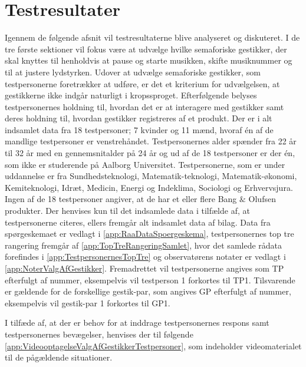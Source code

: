 \chapter{Testresultater}
\label{Testresultater}
%
Igennem de følgende afsnit vil testresultaterne blive analyseret og diskuteret. I de tre første sektioner vil fokus være at udvælge hvilke semaforiske gestikker, der skal knyttes til henholdvis at pause og starte musikken, skifte musiknummer og til at justere lydstyrken. Udover at udvælge semaforiske gestikker, som testpersonerne foretrækker at udføre, er det et kriterium for udvælgelsen, at gestikkerne ikke indgår naturligt i kropssproget. Efterfølgende belyses testpersonernes holdning til, hvordan det er at interagere med gestikker samt deres holdning til, hvordan gestikker registreres af et produkt.\blankline
%
Der er i alt indsamlet data fra 18 testpersoner; 7 kvinder og 11 mænd, hvoraf én af de mandlige testpersoner er venstrehåndet. Testpersonernes alder spænder fra 22 år til 32 år med en gennemsnitalder på 24 år og ud af de 18 testpersoner er der én, som ikke er studerende på Aalborg Universitet. Testpersonerne, som er under uddannelse er fra Sundhedsteknologi, Matematik-teknologi, Matematik-økonomi, Kemiteknologi, Idræt, Medicin, Energi og Indeklima, Sociologi og Erhvervsjura. Ingen af de 18 testpersoner angiver, at de har et eller flere Bang $\&$ Olufsen produkter. Der henvises kun til det indsamlede data i tilfælde af, at testpersonerne citeres, ellers fremgår alt indsamlet data af bilag. Data fra spørgeskemaet er vedlagt i \autoref{app:RaaDataSpoergeskema}, testpersonernes top tre rangering fremgår af \autoref{app:TopTreRangeringSamlet}, hvor det samlede rådata forefindes i \autoref{app:TestpersonernesTopTre} og observatørens notater er vedlagt i \autoref{app:NoterValgAfGestikker}. Fremadrettet vil testpersonerne angives som TP efterfulgt af nummer, eksempelvis vil testperson 1 forkortes til TP1. Tilsvarende er gældende for de forskellige gestik-par, som angives GP efterfulgt af nummer, eksempelvis vil gestik-par 1 forkortes til GP1.

I tilfæde af, at der er behov for at inddrage testpersonernes respons samt testpersonernes bevægelser, henvises der til følgende \autoref{app:VideooptagelseValgAfGestikkerTestpersoner}, som indeholder videomaterialet til de pågældende situationer.       